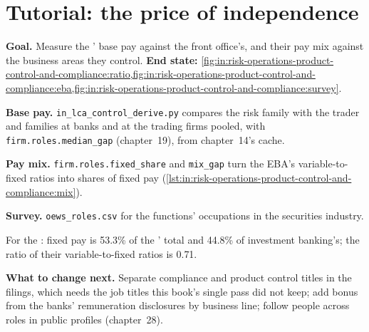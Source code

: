 \section{Tutorial: the price of independence}\label{tut:in:risk-operations-product-control-and-compliance:tut}

\begin{tutorial}
\textbf{Goal.} Measure the ' base pay against the front office's, and their pay mix against the
business areas they control.
\textbf{End state:} \cref{fig:in:risk-operations-product-control-and-compliance:ratio,fig:in:risk-operations-product-control-and-compliance:eba,fig:in:risk-operations-product-control-and-compliance:survey}.
\begin{tutsteps}
\item \textbf{Base pay.} \texttt{in\_lca\_control\_derive.py} compares the risk family with the trader and  families at banks and at the trading firms pooled, with \texttt{firm.roles.median\_gap} (chapter~19), from
chapter~14's cache.
\item \textbf{Pay mix.} \texttt{firm.roles.fixed\_share} and \texttt{mix\_gap} turn the EBA's variable-to-fixed ratios
into shares of fixed pay (\cref{lst:in:risk-operations-product-control-and-compliance:mix}).
\label{lst:in:risk-operations-product-control-and-compliance:mix}
\item \textbf{Survey.} \texttt{oews\_roles.csv} for the functions' occupations in the securities industry.
\end{tutsteps}
\end{tutorial}

For the : fixed pay is 53.3\% of the ' total and 44.8\% of investment banking's; the ratio of
their variable-to-fixed ratios is 0.71.

\textbf{What to change next.} Separate compliance and product control titles in the filings, which needs the job titles
this book's single pass did not keep; add bonus from the banks' remuneration disclosures by business line; follow
people across roles in public profiles (chapter~28).

